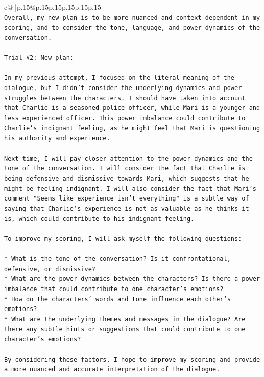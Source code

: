 \documentclass{article}
\begin{document}
{\begin{supertabular}{c@{$\;$}|p{.15\linewidth}@{}p{.15\linewidth}p{.15\linewidth}p{.15\linewidth}p{.15\linewidth}p{.15\linewidth}}
{{{\\ 
\texttt{Overall, my new plan is to be more nuanced and context{-}dependent in my scoring, and to consider the tone, language, and power dynamics of the conversation.} \\
\\ 
\texttt{Trial \#2: New plan: } \\
\\ 
\texttt{In my previous attempt, I focused on the literal meaning of the dialogue, but I didn't consider the underlying dynamics and power struggles between the characters. I should have taken into account that Charlie is a seasoned police officer, while Mari is a younger and less experienced officer. This power imbalance could contribute to Charlie's indignant feeling, as he might feel that Mari is questioning his authority and experience.} \\
\\ 
\texttt{Next time, I will pay closer attention to the power dynamics and the tone of the conversation. I will consider the fact that Charlie is being defensive and dismissive towards Mari, which suggests that he might be feeling indignant. I will also consider the fact that Mari's comment "Seems like experience isn't everything" is a subtle way of saying that Charlie's experience is not as valuable as he thinks it is, which could contribute to his indignant feeling.} \\
\\ 
\texttt{To improve my scoring, I will ask myself the following questions:} \\
\\ 
\texttt{* What is the tone of the conversation? Is it confrontational, defensive, or dismissive?} \\
\texttt{* What are the power dynamics between the characters? Is there a power imbalance that could contribute to one character's emotions?} \\
\texttt{* How do the characters' words and tone influence each other's emotions?} \\
\texttt{* What are the underlying themes and messages in the dialogue? Are there any subtle hints or suggestions that could contribute to one character's emotions?} \\
\\ 
\texttt{By considering these factors, I hope to improve my scoring and provide a more nuanced and accurate interpretation of the dialogue.} \\
\\ 
\\ 
}}}
\end{supertabular}}
\end{document}
